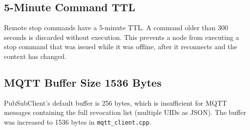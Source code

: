 \subsection{5-Minute Command TTL}

Remote stop commands have a 5-minute TTL. A command older than 300 seconds is discarded without execution. This prevents a node from executing a stop command that was issued while it was offline, after it reconnects and the context has changed.

\subsection{MQTT Buffer Size 1536 Bytes}

PubSubClient's default buffer is 256 bytes, which is insufficient for MQTT messages containing the full revocation list (multiple UIDs as JSON). The buffer was increased to 1536 bytes in \texttt{mqtt\_client.cpp}.
